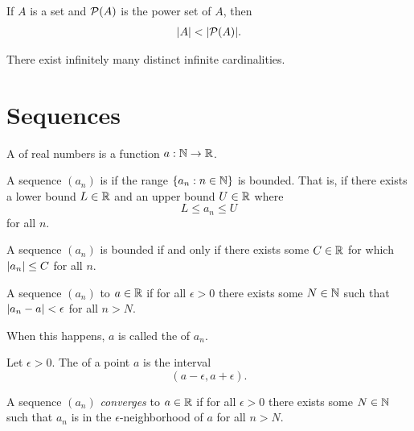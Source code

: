 \documentclass[11pt,twoside=off,numbers=noenddot]{scrbook}
\begin{document}
\begin{theorem}
    If $A$ is a set and $\mathcal{P}(A)$ is the power set of $A$, then
    \begin{align*}
        | A | < | \mathcal{P}(A) |.
    \end{align*}
\end{theorem}

\begin{corollary}
    There exist infinitely many distinct infinite cardinalities.
\end{corollary}

\chapter{Sequences}

\begin{definition}
    A  of real numbers is a function $a : \mathbb N \to \mathbb R$.
\end{definition}

\begin{definition}
    A sequence $(a_n)$ is  if the range $\{ a_n : n \in \mathbb N \}$ is bounded. That is, if there exists a lower bound $L \in \mathbb R$ and an upper bound $U \in \mathbb R$ where
    \[ L \leq a_n \leq U \]
    for all $n$.
\end{definition}

\begin{proposition}
    A sequence $(a_n)$ is bounded if and only if there exists some $C \in \mathbb R$ for which $| a_n | \leq C$ for all $n$.
\end{proposition}

\begin{definition}
    A sequence $(a_n)$  to $a \in \mathbb R$ if for all $\epsilon > 0$ there exists some $N \in \mathbb N$ such that $| a_n - a | < \epsilon$ for all $n > N$.

    When this happens, $a$ is called the  of $a_n$.
\end{definition}

\begin{definition}
    Let $\epsilon > 0$. The  of a point $a$ is the interval
    \[ (a - \epsilon, a + \epsilon). \]
\end{definition}

\begin{definition}
    A sequence $(a_n)$ \textit{converges} to $a \in \mathbb R$ if for all $\epsilon > 0$ there exists some $N \in \mathbb N$ such that $a_n$ is in the $\epsilon$-neighborhood of $a$ for all $n > N$.
\end{definition}
\end{document}
